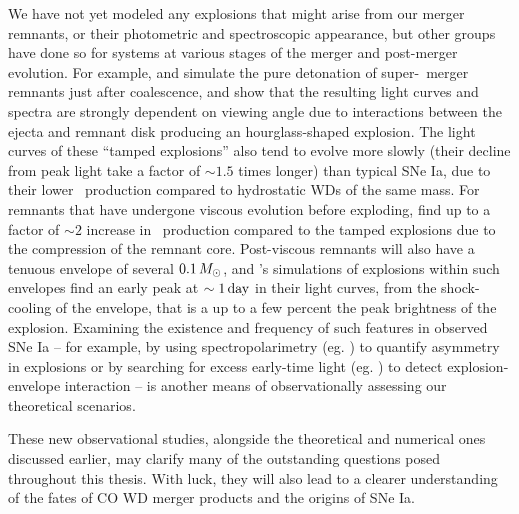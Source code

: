 We have not yet modeled any explosions that might arise from our merger remnants, or their photometric and spectroscopic appearance, but other groups have done so for systems at various stages of the merger and post-merger evolution.  For example, \cite{rask+14} and \cite{vros+15} simulate the pure detonation of super-\Mch\ merger remnants just after coalescence, and show that the resulting light curves and spectra are strongly dependent on viewing angle due to interactions between the ejecta and remnant disk producing an hourglass-shaped explosion.  The light curves of these ``tamped explosions'' also tend to evolve more slowly (their decline from peak light take a factor of $\sim1.5$ times longer) than typical SNe Ia, due to their lower \Ni\ production compared to hydrostatic WDs of the same mass.  For remnants that have undergone viscous evolution before exploding, \cite{rask+14} find up to a factor of $\sim2$ increase in \Ni\ production compared to the tamped explosions due to the compression of the remnant core.  Post-viscous remnants will also have a tenuous envelope of several $0.1\,\Msun$, and \cite{pirom15}'s simulations of explosions within such envelopes find an early peak at $\sim1\,\mathrm{day}$ in their light curves, from the shock-cooling of the envelope, that is a up to a few percent the peak brightness of the explosion. Examining the existence and frequency of such features in observed SNe Ia -- for example, by using spectropolarimetry (eg. \citealt{bullsk15}) to quantify asymmetry in explosions or by  searching for excess early-time light (eg. \citealt{mari+16}) to detect explosion-envelope interaction -- is another means of observationally assessing our theoretical scenarios.

These new observational studies, alongside the theoretical and numerical ones discussed earlier, may clarify many of the outstanding questions posed throughout this thesis.  With luck, they will also lead to a clearer understanding of the fates of CO WD merger products and the origins of SNe Ia.



